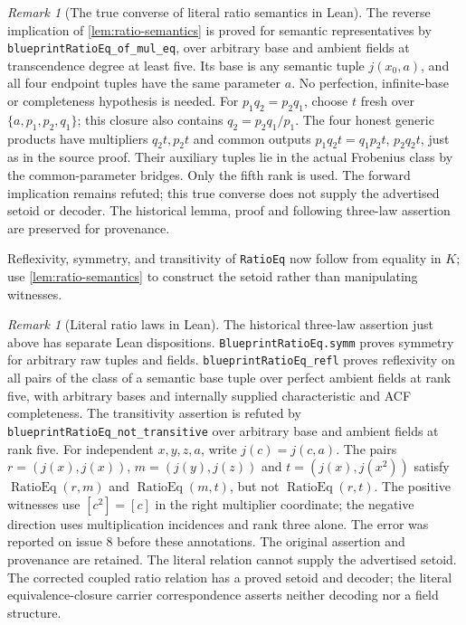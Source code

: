 \documentclass[11pt,oneside]{article}
\theoremstyle{definition}
\theoremstyle{remark}
\newtheorem{remark}[theorem]{Remark}
\newcommand{\lean}[1]{\nolinkurl{#1}}
\begin{document}
\begin{remark}[The true converse of literal ratio semantics in Lean]\label{rem:literal-ratio-converse}
The reverse implication of \cref{lem:ratio-semantics} is proved for semantic
representatives by \lean{blueprintRatioEq_of_mul_eq}, over arbitrary base and ambient
fields at transcendence degree at least five. Its base is any semantic tuple $j(x_0,a)$,
and all four endpoint tuples have the same parameter $a$. No perfection, infinite-base
or completeness hypothesis is needed.
For $p_1q_2=p_2q_1$, choose $t$ fresh over $\{a,p_1,p_2,q_1\}$; this closure also
contains $q_2=p_2q_1/p_1$. The four honest generic products have multipliers $q_2t,p_2t$
and common outputs $p_1q_2t=q_1p_2t$, $p_2q_2t$, just as in the source proof.
Their auxiliary tuples lie in the actual Frobenius class by the common-parameter
bridges. Only the fifth rank is used. The forward implication remains refuted;
this true converse does not supply the advertised setoid or decoder. The historical
lemma, proof and following three-law assertion are preserved for provenance.
\end{remark}

Reflexivity, symmetry, and transitivity of \lean{RatioEq} now follow from equality in
$K$; use \cref{lem:ratio-semantics} to construct the setoid rather than manipulating
witnesses.

\begin{remark}[Literal ratio laws in Lean]\label{rem:literal-ratio-laws}
The historical three-law assertion just above has separate Lean dispositions.
\lean{BlueprintRatioEq.symm} proves symmetry for arbitrary raw tuples and fields.
\lean{blueprintRatioEq_refl} proves reflexivity on all pairs of the class of a semantic
base tuple over perfect ambient fields at rank five, with arbitrary bases and internally
supplied characteristic and ACF completeness. The transitivity assertion is refuted by
\lean{blueprintRatioEq_not_transitive} over arbitrary base and ambient fields at rank five.
For independent $x,y,z,a$, write $j(c)=j(c,a)$. The pairs
$r=(j(x),j(x))$, $m=(j(y),j(z))$ and $t=(j(x),j(x^2))$ satisfy
$\operatorname{RatioEq}(r,m)$ and $\operatorname{RatioEq}(m,t)$, but not
$\operatorname{RatioEq}(r,t)$. The positive witnesses use $[c^2]=[c]$ in the right
multiplier coordinate; the negative direction uses multiplication incidences and rank
three alone. The error was reported on issue 8 before these annotations. The original
assertion and provenance are retained. The literal relation cannot supply the advertised
setoid. The corrected coupled ratio relation has a proved setoid and decoder; the
literal equivalence-closure carrier correspondence asserts neither decoding nor a field
structure.
\end{remark}
\end{document}
